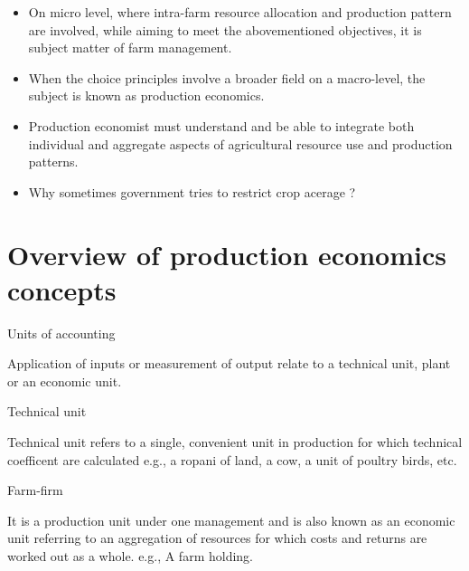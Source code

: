 \documentclass[12pt,ignorenonframetext,aspectratio=169]{beamer}
\providecommand{\tightlist}{%
  \setlength{\itemsep}{0pt}\setlength{\parskip}{0pt}}
\begin{document}
\begin{frame}{}
\protect\hypertarget{section-1}{}

\begin{itemize}
\tightlist
\item
  On micro level, where intra-farm resource allocation and production
  pattern are involved, while aiming to meet the abovementioned
  objectives, it is subject matter of farm management.
\item
  When the choice principles involve a broader field on a macro-level,
  the subject is known as production economics.
\item
  Production economist must understand and be able to integrate both
  individual and aggregate aspects of agricultural resource use and
  production patterns.
\item
  Why sometimes government tries to restrict crop acerage ?
\end{itemize}

\end{frame}

\hypertarget{overview-of-production-economics-concepts}{%
\section{Overview of production economics
concepts}\label{overview-of-production-economics-concepts}}

\begin{frame}{}
\protect\hypertarget{section-2}{}

\begin{block}{Units of accounting}

Application of inputs or measurement of output relate to a technical
unit, plant or an economic unit.

\end{block}

\begin{block}{Technical unit}

Technical unit refers to a single, convenient unit in production for
which technical coefficent are calculated e.g., a ropani of land, a cow,
a unit of poultry birds, etc.

\end{block}

\begin{block}{Farm-firm}

It is a production unit under one management and is also known as an
economic unit referring to an aggregation of resources for which costs
and returns are worked out as a whole. e.g., A farm holding.

\end{block}

\end{frame}
\end{document}
